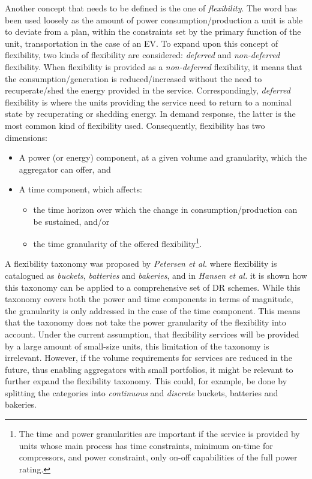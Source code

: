 Another concept that needs to be defined is the one of \emph{flexibility}. The word has been used loosely as the amount of power consumption/production a unit is able to deviate from a plan, within the constraints set by the primary function of the unit, \eg transportation in the case of an EV. To expand upon this concept of flexibility, two kinds of flexibility are considered: \emph{deferred} and \emph{non-deferred} flexibility. When flexibility is provided as a \emph{non-deferred} flexibility,  it means that the consumption/generation is reduced/increased without the need to recuperate/shed the energy provided in the service. Correspondingly, \emph{deferred} flexibility is where the units providing the service need to return to a nominal state by recuperating or shedding energy. In demand response, the latter is the most common kind of flexibility used. Consequently, flexibility has two dimensions:
\begin{itemize}
	\item A power (or energy) component, at a given volume and granularity, which the aggregator can offer, and
	\item A time component, which affects:
		\begin{itemize}
			\item the time horizon over which the change in consumption/production can be sustained, and/or
			\item the time granularity of the offered flexibility\footnote{The time and power granularities are important if the service is provided by units whose main process has time constraints, \eg minimum on-time for compressors, and power constraint, \eg only on-off capabilities of the full power rating.}.
		\end{itemize}
\end{itemize}

A flexibility taxonomy was proposed by \emph{Petersen et al.} where flexibility is catalogued as \emph{buckets}, \emph{batteries} and \emph{bakeries}, and in \emph{Hansen et al.} it is shown how this taxonomy can be applied to a comprehensive set of DR schemes. While this taxonomy covers both the power and time components in terms of magnitude, the granularity is only addressed in the case of the time component. This means that the taxonomy does not take the power granularity of the flexibility into account. Under the current assumption, \ie that flexibility services will be provided by a large amount of small-size units, this limitation of the taxonomy is irrelevant. However, if the volume requirements for services are reduced in the future, thus enabling aggregators with small portfolios, it might be relevant to further expand the flexibility taxonomy. This could, for example, be done by splitting the categories into \emph{continuous} and \emph{discrete} buckets, batteries and bakeries.


